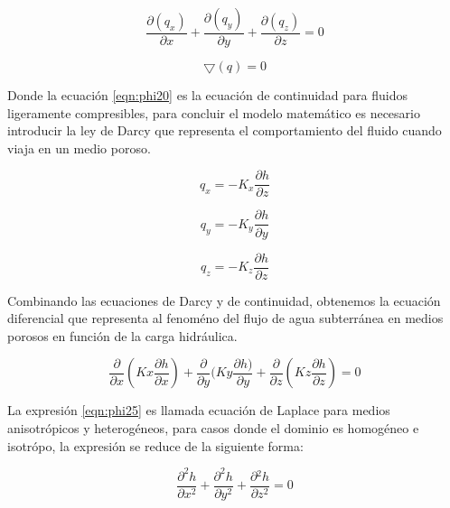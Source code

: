 \begin{equation}
\label{eqn:phi20}     \dfrac{\partial{(q_{x})}}{\partial{x}}+\dfrac{\partial{(q_{y})}}{\partial{y}}+\dfrac{\partial(q_{z})}{\partial{z}}=0
\end{equation}

\begin{equation}
\label{eqn:phi21}
\bigtriangledown(q)=0
\end{equation}

Donde la ecuación \ref{eqn:phi20} es la ecuación de continuidad para fluidos ligeramente compresibles, para concluir el modelo matemático es necesario introducir la ley de Darcy que representa el comportamiento del fluido cuando viaja en un medio poroso.

\begin{equation}
\label{eqn:phi22}
q_{x}=-K_{x}\dfrac{\partial{h}}{\partial{z}}
\end{equation}

\begin{equation}
\label{eqn:phi23}                          q_{y}=-K_{y}\dfrac{\partial{h}}{\partial{y}}
\end{equation}

\begin{equation}
\label{eqn:phi24}                         q_{z}=-K_{z}\dfrac{\partial{h}}{\partial{z}}
\end{equation}

Combinando las ecuaciones de Darcy y de continuidad, obtenemos la ecuación diferencial que representa al fenoméno del flujo de agua subterránea en medios porosos en función de la carga hidráulica.

\begin{equation}
\label{eqn:phi25}                         
\dfrac{\partial}{\partial{x}}(Kx\dfrac{\partial{h}}{\partial{x}})+\dfrac{\partial}{\partial{y}}(Ky\dfrac{\partial{h})}{\partial{y}}+\dfrac{\partial}{\partial{z}}(Kz\dfrac{\partial{h}}{\partial{z}})=0
\end{equation}

La expresión \ref{eqn:phi25} es llamada ecuación de Laplace para medios anisotrópicos y heterogéneos, para casos donde el dominio es homogéneo e isotrópo, la expresión se reduce de la siguiente forma:

\begin{equation}
\label{eqn:phi26}
\dfrac{\partial^{2}h}{\partial{x^{2}}}+\dfrac{\partial^{2}h}{\partial{y^{2}}}+\dfrac{\partial{^{2}h}}{\partial{z^{2}}}=0
\end{equation}


